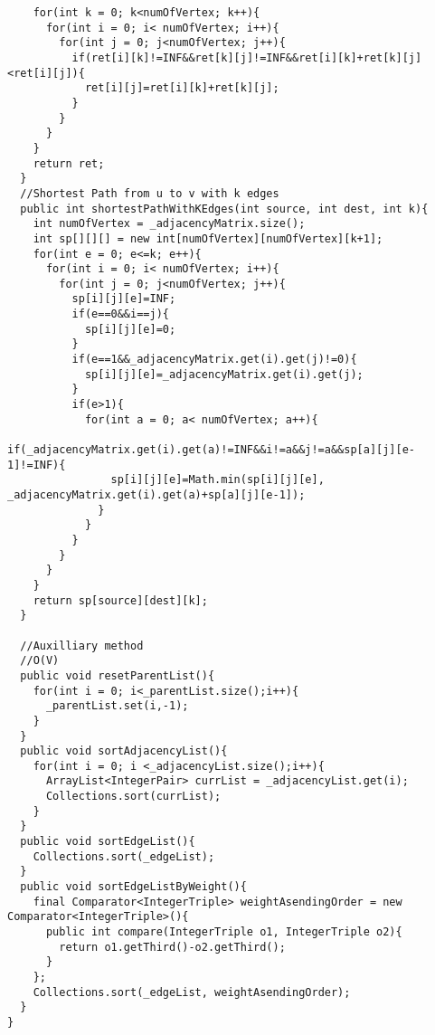\documentclass[11pt]{article}
\theoremstyle{definition}
\begin{document}
\begin{verbatim}
    for(int k = 0; k<numOfVertex; k++){
      for(int i = 0; i< numOfVertex; i++){
        for(int j = 0; j<numOfVertex; j++){
          if(ret[i][k]!=INF&&ret[k][j]!=INF&&ret[i][k]+ret[k][j]<ret[i][j]){
            ret[i][j]=ret[i][k]+ret[k][j];
          }
        }
      }
    }
    return ret;
  }
  //Shortest Path from u to v with k edges
  public int shortestPathWithKEdges(int source, int dest, int k){
    int numOfVertex = _adjacencyMatrix.size();
    int sp[][][] = new int[numOfVertex][numOfVertex][k+1];
    for(int e = 0; e<=k; e++){
      for(int i = 0; i< numOfVertex; i++){
        for(int j = 0; j<numOfVertex; j++){
          sp[i][j][e]=INF;
          if(e==0&&i==j){
            sp[i][j][e]=0;
          }
          if(e==1&&_adjacencyMatrix.get(i).get(j)!=0){
            sp[i][j][e]=_adjacencyMatrix.get(i).get(j);
          }
          if(e>1){
            for(int a = 0; a< numOfVertex; a++){
              if(_adjacencyMatrix.get(i).get(a)!=INF&&i!=a&&j!=a&&sp[a][j][e-1]!=INF){
                sp[i][j][e]=Math.min(sp[i][j][e], _adjacencyMatrix.get(i).get(a)+sp[a][j][e-1]);
              }
            }
          }
        }
      }
    }
    return sp[source][dest][k];
  }

  //Auxilliary method
  //O(V)
  public void resetParentList(){
    for(int i = 0; i<_parentList.size();i++){
      _parentList.set(i,-1);
    }
  }
  public void sortAdjacencyList(){
    for(int i = 0; i <_adjacencyList.size();i++){
      ArrayList<IntegerPair> currList = _adjacencyList.get(i);
      Collections.sort(currList);
    }
  }
  public void sortEdgeList(){
    Collections.sort(_edgeList);
  }
  public void sortEdgeListByWeight(){
    final Comparator<IntegerTriple> weightAsendingOrder = new Comparator<IntegerTriple>(){
      public int compare(IntegerTriple o1, IntegerTriple o2){
        return o1.getThird()-o2.getThird();
      }
    };
    Collections.sort(_edgeList, weightAsendingOrder);
  }
}
\end{verbatim}
\end{document}
